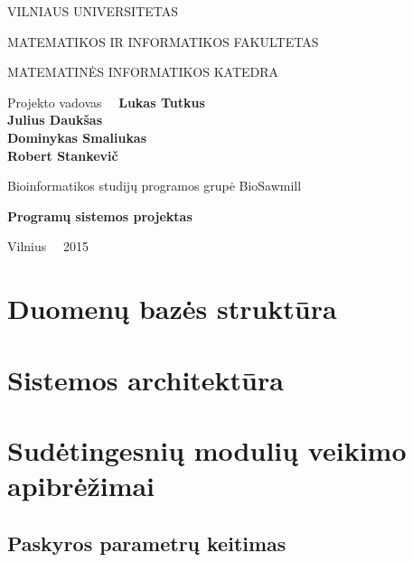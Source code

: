 \documentclass[a4paper,12pt]{article}
\begin{document}
\graphicspath{ {/} }

\renewcommand{\cftdot}{.}	
\renewcommand{\cftsecleader}{\cftdotfill{\cftdotsep}}

\thispagestyle{empty} %


\begin{center}
 VILNIAUS UNIVERSITETAS 
 
MATEMATIKOS IR INFORMATIKOS FAKULTETAS

MATEMATINĖS INFORMATIKOS KATEDRA

\vspace{4cm}

Projekto vadovas \ \ \textbf{Lukas Tutkus} \\
\textbf{Julius Daukšas} \\
\textbf{Dominykas Smaliukas} \\
\textbf{Robert Stankevič} \\

\vspace{0.2cm}

Bioinformatikos studijų programos grupė BioSawmill



\vspace{3cm}
\textbf{\Large Programų sistemos projektas}\\


\vfill

Vilnius \ \  2015
\end{center}



\clearpage

\tableofcontents
\clearpage

\section{Duomenų bazės struktūra}


\section{Sistemos architektūra}


\section{Sudėtingesnių modulių veikimo apibrėžimai}

\subsection{ Paskyros parametrų keitimas }
\end{document}
